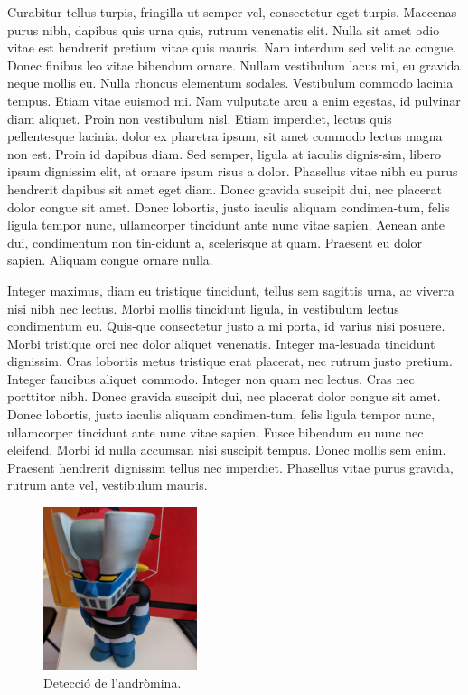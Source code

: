 ﻿\documentclass[10pt,a4paper,twocolumn,twoside]{article}
\begin{document}
Curabitur tellus turpis, fringilla ut semper vel, consectetur eget turpis. Maecenas purus nibh, dapibus quis urna quis, rutrum venenatis elit. Nulla sit amet odio vitae est hendrerit pretium vitae quis mauris. Nam interdum sed velit ac congue. Donec finibus leo vitae bibendum ornare. Nullam vestibulum lacus mi, eu gravida neque mollis eu. Nulla rhoncus elementum sodales. Vestibulum commodo lacinia tempus. Etiam vitae euismod mi. Nam vulputate arcu a enim egestas, id pulvinar diam aliquet. Proin non vestibulum nisl. Etiam imperdiet, lectus quis pellentesque lacinia, dolor ex pharetra ipsum, sit amet commodo lectus magna non est. Proin id dapibus diam. Sed semper, ligula at iaculis dignis-sim, libero ipsum dignissim elit, at ornare ipsum risus a dolor. Phasellus vitae nibh eu purus hendrerit dapibus sit amet eget diam. Donec gravida suscipit dui, nec placerat dolor congue sit amet. Donec lobortis, justo iaculis aliquam condimen-tum, felis ligula tempor nunc, ullamcorper tincidunt ante nunc vitae sapien. Aenean ante dui, condimentum non tin-cidunt a, scelerisque at quam. Praesent eu dolor sapien. Aliquam congue ornare nulla. 

Integer maximus, diam eu tristique tincidunt, tellus sem sagittis urna, ac viverra nisi nibh nec lectus. Morbi mollis tincidunt ligula, in vestibulum lectus condimentum eu. Quis-que consectetur justo a mi porta, id varius nisi posuere. Morbi tristique orci nec dolor aliquet venenatis. Integer ma-lesuada tincidunt dignissim. Cras lobortis metus tristique erat placerat, nec rutrum justo pretium. Integer faucibus aliquet commodo. Integer non quam nec lectus. Cras nec porttitor nibh. Donec gravida suscipit dui, nec placerat dolor congue sit amet. Donec lobortis, justo iaculis aliquam condimen-tum, felis ligula tempor nunc, ullamcorper tincidunt ante nunc vitae sapien. Fusce bibendum eu nunc nec eleifend. Morbi id nulla accumsan nisi suscipit tempus. Donec mollis sem enim. Praesent hendrerit dignissim tellus nec imperdiet. Phasellus vitae purus gravida, rutrum ante vel, vestibulum mauris.


\begin{figure}[!h]
\centering
	\includegraphics[width=0.4\textwidth]{figs/Fig2.jpg}
	\caption{Detecció de l’andròmina.}
	\label{f:detall}
\end{figure}
\end{document}
